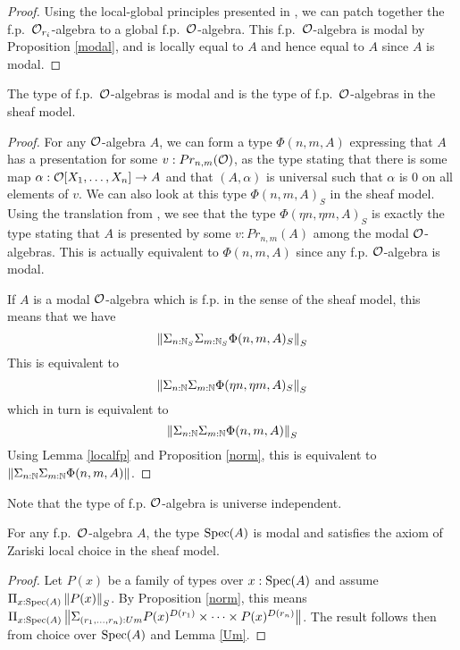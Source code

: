     \begin{proof}
      Using the local-global principles presented in \cite{lombardi-quitte}, we can patch together the f.p.\ $\mathcal O_{r_i}$-algebra
      to a global f.p.\ $\mathcal O$-algebra. This f.p.\ $\mathcal O$-algebra is modal by Proposition \ref{modal}, and is locally equal to $A$
      and hence equal to $A$ since $A$ is modal.
    \end{proof}

    \begin{corollary}
      The type of f.p.\ $\mathcal O$-algebras is modal and is the type of f.p.\ $\mathcal O$-algebras in the sheaf model.
    \end{corollary}

    \begin{proof}
          For any $\mathcal O$-algebra $A$, we can form a type $\Phi(n,m,A)$ expressing that $A$ has a presentation for some $v:Pr_{n,m}(\mathcal O)$,
    as the type stating that there is some map $\alpha:\mathcal O[X_1,\dots,X_n]\rightarrow A$ and that $(A,\alpha)$ is universal such that
    $\alpha$ is $0$ on all elements of $v$. We can also look at this type $\Phi(n,m,A)_S$ in the sheaf model. Using the translation
    from \cite{Quirin16,CRS21}, we see that the type $\Phi(\eta n,\eta m,A)_S$ is exactly the type stating that $A$ is presented by
    some $v:Pr_{n,m}(A)$ among the modal $\mathcal O$-algebras. This is actually equivalent to $\Phi(n,m,A)$ since any f.p. $\mathcal O$-algebra is modal.

     If $A$ is a modal $\mathcal O$-algebra which is f.p. in the sense of the sheaf model, this means that we have
     $$\left\lVert \Sigma_{n:\mathbb{N}_S}\Sigma_{m:\mathbb{N}_S}\Phi(n,m,A)_S \right\rVert_S$$
     This is equivalent to
     $$\left\lVert \Sigma_{n:\mathbb{N}}\Sigma_{m:\mathbb{N}}\Phi(\eta n,\eta m,A)_S \right\rVert_S$$
     which in turn is equivalent to
     $$\left\lVert \Sigma_{n:\mathbb{N}}\Sigma_{m:\mathbb{N}}\Phi(n,m,A) \right\rVert_S$$
     Using Lemma \ref{localfp} and Proposition \ref{norm}, this is equivalent to $\left\lVert \Sigma_{n:\mathbb{N}}\Sigma_{m:\mathbb{N}}\Phi(n,m,A) \right\rVert$.
    \end{proof}

     Note that the type of f.p. $\mathcal O$-algebra is universe independent.

    \begin{proposition}
      For any f.p.\ $\mathcal O$-algebra $A$, the type $\operatorname{Spec}(A)$ is modal and satisfies the axiom of Zariski local choice in
      the sheaf model.
    \end{proposition}
    
    \begin{proof}
      Let $P(x)$ be a family of types over $x:\operatorname{Spec}(A)$ and assume $\Pi_{x:\operatorname{Spec}(A)}\left\lVert P(x) \right\rVert_S$. By Proposition \ref{norm},
      this means $\Pi_{x:\operatorname{Spec}(A)}\left\lVert \Sigma_{(r_1,\dots,r_n):Um}P(x)^{D(r_1)}\times\dots\times P(x)^{D(r_n)} \right\rVert$. The result follows
      then from choice over $\operatorname{Spec}(A)$ and Lemma \ref{Um}.
    \end{proof}      

